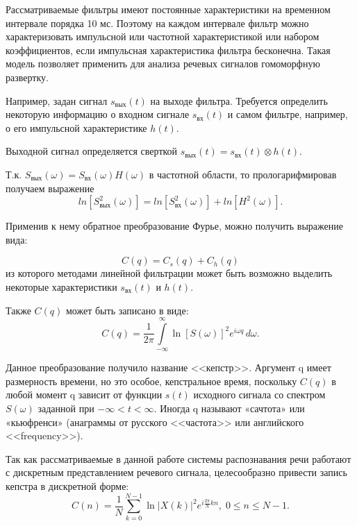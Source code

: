 \documentclass[a4paper,14pt,russian,utf8,nocolumnsxix,nocolumnxxxi,nocolumnxxxii]{eskdtext}
\begin{document}
Рассматриваемые фильтры имеют постоянные характеристики на временном интервале порядка 10 мс. Поэтому на каждом интервале фильтр можно характеризовать импульсной или частотной характеристикой или набором коэффициентов, если импульсная характеристика фильтра бесконечна. Такая модель позволяет применить для анализа речевых сигналов гомоморфную развертку.


Например, задан сигнал $s_{\text{вых}}(t)$ на выходе фильтра. Требуется определить некоторую информацию о входном сигнале $s_{\text{вх}}(t)$ и самом фильтре, например, о его импульсной характеристике $h(t)$.

Выходной сигнал определяется сверткой $s_{\text{вых}}(t)=s_{\text{вх}}(t)\otimes h(t)$.

Т.к. $S_{\text{вых}}(\omega)=S_{\text{вх}}(\omega)H(\omega)$ в частотной области, то прологарифмировав получаем выражение 
\begin{equation}
ln[S^2_{\text{вых}}(\omega)]=ln[S^{2}_{\text{вх}}(\omega)]+ln[H^{2}(\omega)].
\end{equation}

Применив к нему обратное преобразование Фурье, можно получить выражение вида:

\begin{equation}
C(q)=C_{s}(q)+C_{h}(q)
\end{equation}
из которого методами линейной фильтрации может быть возможно выделить некоторые характеристики $s_{\text{вх}}(t)$ и $h(t)$.

Также $C(q)$ может быть записано в виде:
\begin{equation}
 C(q)={\frac{1}{2\pi}}\int\limits_{-\infty}^{\infty} \ln [S(\omega)]^2 e^{i\omega q}\, d\omega .
\end{equation}

Данное преобразование получило название <<кепстр>>. Аргумент q имеет размерность времени, но это особое, кепстральное время, поскольку $C(q)$ в любой момент q зависит от функции $s(t)$ исходного сигнала со спектром $S(\omega)$ заданной при $-\infty<t<\infty$. Иногда q называют «сачтота» или «кьюфренси» (анаграммы от русского <<частота>> или английского <<frequency>>).

Так как рассматриваемые в данной работе системы распознавания речи работают с дискретным представлением речевого сигнала, целесообразно привести запись кепстра в дискретной форме:
\begin{equation}
C(n)=\frac{1}{N}\sum_{k=0}^{N-1}{\ln|{X(k)}|^2e^{i\frac{2\pi}{N}kn}}, \; 0\leq n\leq N-1.
\end{equation}
\end{document}
